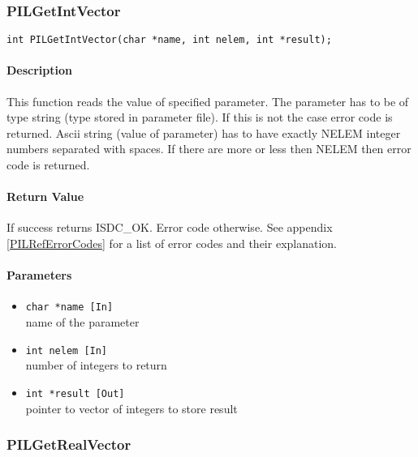 
\subsubsection{PILGetIntVector}

\begin{verbatim}
int PILGetIntVector(char *name, int nelem, int *result); 
\end{verbatim}

\paragraph{Description\\}
This function reads the value of specified parameter. The parameter has
to be of type string (type stored in parameter file). If this is not the
case error code is returned. Ascii string (value of parameter) has to have
exactly NELEM integer numbers separated with spaces. If there are more
or less then NELEM then error code is returned.


\paragraph{Return Value\\}
If success returns ISDC\_OK. Error code otherwise. See appendix \ref{PILRefErrorCodes}
for a list of error codes and their explanation.

\paragraph{Parameters}
\begin{itemize}
\item
{\tt char *name [In]} \\
name of the parameter 
\item
{\tt int nelem [In]} \\
number of integers to return
\item
{\tt int *result [Out]} \\
pointer to vector of integers to store result

\end{itemize}



\subsubsection{PILGetRealVector}

